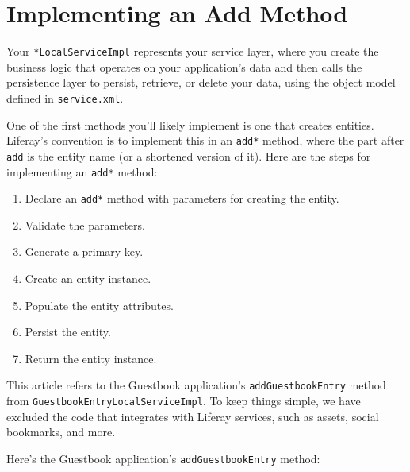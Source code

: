 \chapter{Implementing an Add Method}\label{implementing-an-add-method}

Your \texttt{*LocalServiceImpl} represents your service layer, where you
create the business logic that operates on your application's data and
then calls the persistence layer to persist, retrieve, or delete your
data, using the object model defined in \texttt{service.xml}.

One of the first methods you'll likely implement is one that creates
entities. Liferay's convention is to implement this in an \texttt{add*}
method, where the part after \texttt{add} is the entity name (or a
shortened version of it). Here are the steps for implementing an
\texttt{add*} method:

\begin{enumerate}
\def\labelenumi{\arabic{enumi}.}
\item
  Declare an \texttt{add*} method with parameters for creating the
  entity.
\item
  Validate the parameters.
\item
  Generate a primary key.
\item
  Create an entity instance.
\item
  Populate the entity attributes.
\item
  Persist the entity.
\item
  Return the entity instance.
\end{enumerate}

This article refers to the Guestbook application's
\texttt{addGuestbookEntry} method from
\texttt{GuestbookEntryLocalServiceImpl}. To keep things simple, we have
excluded the code that integrates with Liferay services, such as assets,
social bookmarks, and more.

Here's the Guestbook application's \texttt{addGuestbookEntry} method:

